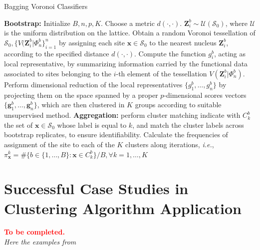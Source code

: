 \begin{algorithm}[H]
    \caption{Bagging Voronoi Classifiers}
    \label{alg:bvc}
    \begin{algorithmic}[1]
    \STATE \textbf{Bootstrap:}
    \STATE Initialize $B, n, p, K$. Choose a metric $d(\cdot,\cdot).$
    \STATE $\mathbf{Z}_i^b\sim\mathcal{U}(\mathcal{S}_0)$, where $\mathcal{U}$ is the uniform distribution on the lattice. Obtain a random Voronoi tessellation of $\mathcal{S}_0, \{V(\mathbf{Z}_i^b|\Phi_n^b\}^n_{i=1}$ by assigning each site $\mathbf{x}\in \mathcal{S}_0$ to the nearest nucleus $\mathbf{Z}_i^b$, according to the specified distance $d(\cdot,\cdot).$
    \ENDFOR
    \STATE Compute the function $g_i^b$, acting as local representative, by summarizing information carried by the functional data associated to sites belonging to the $i$-th element of the tessellation $V(\mathbf{Z}_i^b|\Phi_n^b)$.
    \ENDFOR
    \STATE Perform dimensional reduction of the local representatives $\{g_1^b,\dots, g_n^b\}$ by projecting them on the space spanned by a proper $p$-dimensional scores vectors $\{\mathbf{g}_1^b,\dots, \mathbf{g}_n^b\}$, which are then clustered in $K$ groups according to suitable unsupervised method.
    \ENDFOR
    \STATE \textbf{Aggregation:} perform cluster matching
    \STATE indicate with $C_k^b$ the set of $\mathbf{x} \in \mathcal{S}_0$ whose label is equal to $k$, and match the cluster labels across bootstrap replicates, to ensure identifiability.
    \ENDFOR
    \ENDFOR
    \STATE Calculate the frequencies of assignment of the site to each of the $K$ clusters along iterations, \textit{i.e.}, $\pi_{\mathbf{x}}^k=\#\{b\in\{1,\dots,B\}:\mathbf{x}\in C_k^b\}/B, \forall k=1,\dots,K$
    \ENDFOR
    \end{algorithmic}
\end{algorithm} 


\section{Successful Case Studies in Clustering Algorithm Application}
\label{sec:bcv-cases}
\textbf{\textcolor{red}{To be completed.}}
\\
\textit{Here the examples from \cite{secchi_analysis_2015}}
